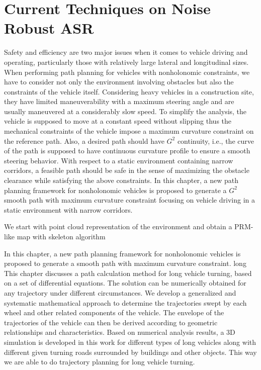 \chapter{Current Techniques on Noise Robust ASR}
\label{chap:turning}
Safety and efficiency are two major issues when it comes to vehicle driving and operating, particularly those with relatively large lateral and longitudinal sizes. When performing path planning for vehicles with nonholonomic constraints, we have to consider not only the environment involving obstacles but also the constraints of the vehicle itself. Considering heavy vehicles in a construction site, they have limited maneuverability with a maximum steering angle and are usually maneuvered at a considerably slow speed. To simplify the analysis, the vehicle is supposed to move at a constant speed without slipping thus the mechanical constraints of the vehicle impose a maximum curvature constraint on the reference path. Also, a desired path should have $G^2$ continuity, i.e., the curve of the path is supposed to have continuous curvature profile to ensure a smooth steering behavior. With respect to a static environment containing narrow corridors, a feasible path should be safe in the sense of maximizing the obstacle clearance while satisfying the above constraints. In this chapter, a new path planning framework for nonholonomic vehicles is proposed to generate a $G^2$ smooth path with maximum curvature constraint focusing on vehicle driving in a static environment with narrow corridors.

We start with point cloud representation of the environment and obtain a PRM-like map \cite{kavraki1996probabilistic} with skeleton algorithm \cite{?}



In this chapter, a new path planning framework for nonholonomic vehicles is proposed to generate a smooth path with maximum curvature constraint. 
long  This chapter discusses a path calculation method for long vehicle turning, based on a set of
differential equations. The solution can be numerically obtained for any trajectory
under different circumstances. We develop a generalized and systematic mathematical approach to determine the trajectories swept by each wheel and other
related components of the vehicle. The envelope of the trajectories of the vehicle
can then be derived according to geometric relationships and characteristics. Based
on numerical analysis results, a 3D simulation is developed in this work for
different types of long vehicles along with different given turning roads surrounded
by buildings and other objects. This way we are able to do trajectory planning for
long vehicle turning.


